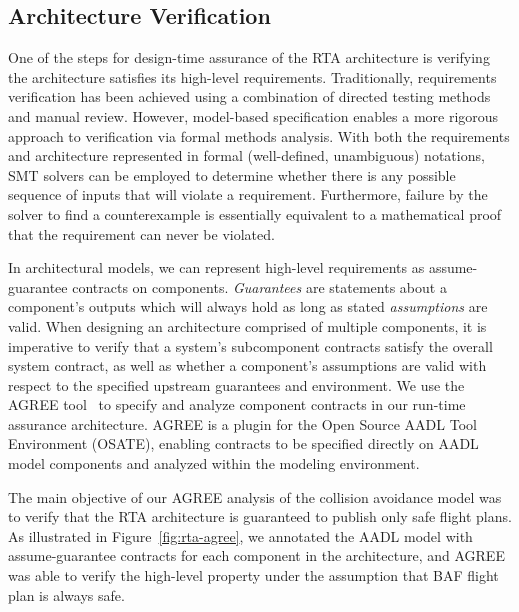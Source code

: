 \subsection{Architecture Verification}


One of the steps for design-time assurance of the RTA architecture is verifying the architecture satisfies its high-level requirements.  Traditionally, requirements verification has been achieved using a combination of directed testing methods and manual review. However, model-based specification enables a more rigorous approach to verification via formal methods analysis. With both the requirements and architecture represented in formal (well-defined, unambiguous) notations, SMT solvers can be employed to determine whether there is any possible sequence of inputs that will violate a requirement.  Furthermore, failure by the solver to find a counterexample is essentially equivalent to a mathematical proof that the requirement can never be violated.  

In architectural models, we can represent high-level requirements as assume-guarantee contracts on components.  \textit{Guarantees} are statements about a component's outputs which will always hold as long as stated \textit{assumptions} are valid.  When designing an architecture comprised of multiple components, it is imperative to verify that a system's subcomponent contracts satisfy the overall system contract, as well as whether a component's assumptions are valid with respect to the specified upstream guarantees and environment.
%
We use the AGREE tool~\cite{agree2012} to specify and analyze component contracts in our run-time assurance architecture.  AGREE is a plugin for the Open Source AADL Tool Environment (OSATE), enabling contracts to be specified directly on AADL model components and analyzed within the modeling environment.


The main objective of our AGREE analysis of the collision avoidance model was to verify that the RTA architecture is guaranteed to publish only safe flight plans.
%
As illustrated in Figure~\ref{fig:rta-agree}, we annotated the AADL model with assume-guarantee contracts for each component in the architecture, and AGREE was able to verify the high-level property under the assumption that BAF flight plan is always safe.

